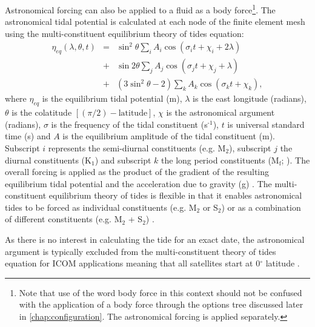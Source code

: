 Astronomical forcing can also be applied to a fluid as a body force\footnote{Note that use of the word body force in this context should not be confused with the application of a body force through the options tree discussed later in \ref{chap:configuration}. The astronomical forcing is applied separately.}.
The astronomical tidal potential is calculated at each node of the finite element mesh using the
multi-constituent equilibrium theory of tides equation:
  \begin{eqnarray}
\eta_{eq}\left(\lambda,\theta,t\right)&=&\sin^{2}\theta\sum_{i}A_{i}\cos\left(\sigma_{i}t+\chi_{i}+2\lambda\right)\nonumber\\
&+&\sin2\theta\sum_{j}A_{j}\cos\left(\sigma_{j}t+\chi_{j}+\lambda\right)\\
&+&\left(3\sin^{2}\theta-2\right)\sum_{k}A_{k}\cos\left(\sigma_{k}t+\chi_{k}\right)\nonumber,
\label{eq:multi-constituent-eq_theory}
  \end{eqnarray}
where $\eta_{eq}$ is the equilibrium tidal potential (m), $\lambda$ is the east longitude (radians), $\theta$ is the colatitude
$[(\pi/2)-{\text{latitude}}]$, $\chi$ is the astronomical argument (radians), $\sigma$
is the frequency of the tidal constituent (s$^{\text{-1}}$), $t$ is universal standard
time (s) and $A$ is the equilibrium amplitude of the tidal constituent (m). Subscript
$i$ represents the semi-diurnal constituents (e.g. M$_{\text{2}}$), subscript $j$
the diurnal constituents (\eg K$_{\text{1}}$) and subscript $k$ the long period
constituents (\eg M$_{\text{f}}$; \citealp{Wells2008}).
The overall forcing
is applied as the product of the gradient of the resulting equilibrium tidal potential and the acceleration due
to gravity (g) \citep{Mellor1996, Kantha2000, Wells2007}.
The multi-constituent equilibrium theory of tides is flexible in that it enables astronomical tides to be forced as
individual constituents
(e.g. M$_{2}$ or S$_{2}$) or as a combination of different constituents (e.g. M$_{2}$ + S$_{2}$) \citep{Wells2008}.

As there is no interest in calculating the tide for an exact date, the astronomical argument
is typically excluded from the multi-constituent theory of tides equation for ICOM applications meaning that all satellites
start at 0$^{\circ}$ latitude \citep{Wells2008}.

